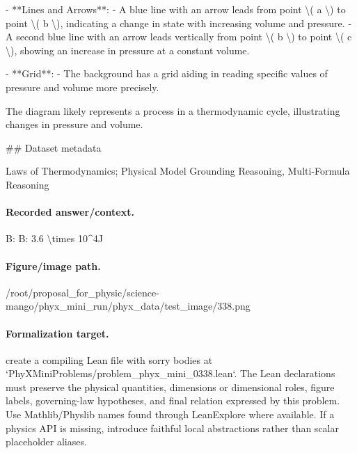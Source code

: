 - **Lines and Arrows**:
  - A blue line with an arrow leads from point \textbackslash{}( a \textbackslash{}) to point \textbackslash{}( b \textbackslash{}), indicating a change in state with increasing volume and pressure.
  - A second blue line with an arrow leads vertically from point \textbackslash{}( b \textbackslash{}) to point \textbackslash{}( c \textbackslash{}), showing an increase in pressure at a constant volume.

- **Grid**:
  - The background has a grid aiding in reading specific values of pressure and volume more precisely.

The diagram likely represents a process in a thermodynamic cycle, illustrating changes in pressure and volume.

\#\# Dataset metadata

Laws of Thermodynamics; Physical Model Grounding Reasoning, Multi-Formula Reasoning

\paragraph{Recorded answer/context.}
B: B: 3.6 \textbackslash{}times 10\textasciicircum{}4J

\paragraph{Figure/image path.}
/root/proposal\_for\_physic/science-mango/phyx\_mini\_run/phyx\_data/test\_image/338.png

\paragraph{Formalization target.}
create a compiling Lean file with sorry bodies at `PhyXMiniProblems/problem\_phyx\_mini\_0338.lean`. The Lean declarations must preserve the physical quantities, dimensions or dimensional roles, figure labels, governing-law hypotheses, and final relation expressed by this problem.
Use Mathlib/Physlib names found through LeanExplore where available. If a physics API is missing, introduce faithful local abstractions rather than scalar placeholder aliases.

